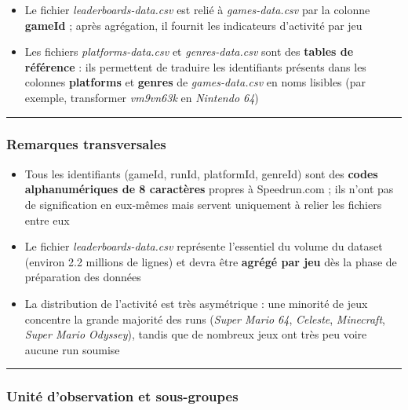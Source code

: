 \documentclass[
]{article}
\providecommand{\tightlist}{%
  \setlength{\itemsep}{0pt}\setlength{\parskip}{0pt}}
\begin{document}
\begin{itemize}
\tightlist
\item
  Le fichier \emph{leaderboards-data.csv} est relié à
  \emph{games-data.csv} par la colonne \textbf{gameId} ; après
  agrégation, il fournit les indicateurs d'activité par jeu
\item
  Les fichiers \emph{platforms-data.csv} et \emph{genres-data.csv} sont
  des \textbf{tables de référence} : ils permettent de traduire les
  identifiants présents dans les colonnes \textbf{platforms} et
  \textbf{genres} de \emph{games-data.csv} en noms lisibles (par
  exemple, transformer \emph{vm9vn63k} en \emph{Nintendo 64})
\end{itemize}

\begin{center}\rule{0.5\linewidth}{0.5pt}\end{center}

\subsubsection{Remarques transversales}\label{remarques-transversales}

\begin{itemize}
\tightlist
\item
  Tous les identifiants (gameId, runId, platformId, genreId) sont des
  \textbf{codes alphanumériques de 8 caractères} propres à Speedrun.com
  ; ils n'ont pas de signification en eux-mêmes mais servent uniquement
  à relier les fichiers entre eux
\item
  Le fichier \emph{leaderboards-data.csv} représente l'essentiel du
  volume du dataset (environ 2.2 millions de lignes) et devra être
  \textbf{agrégé par jeu} dès la phase de préparation des données
\item
  La distribution de l'activité est très asymétrique : une minorité de
  jeux concentre la grande majorité des runs (\emph{Super Mario 64},
  \emph{Celeste}, \emph{Minecraft}, \emph{Super Mario Odyssey}), tandis
  que de nombreux jeux ont très peu voire aucune run soumise
\end{itemize}

\begin{center}\rule{0.5\linewidth}{0.5pt}\end{center}

\subsubsection{Unité d'observation et
sous-groupes}\label{unituxe9-dobservation-et-sous-groupes-1}
\end{document}
